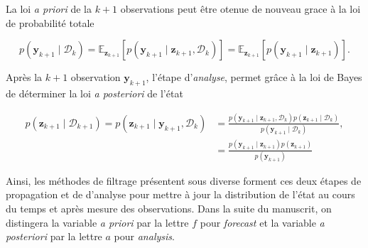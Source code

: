 La loi \textit{a priori} de la $k+1$ observations peut être otenue de nouveau grace à la loi de probabilité totale

\begin{equation*}
    p(\bm y_{k+1} \mid \mathcal D_k) = \mathbb{E}_{\bm{z}_{k+1}}\left[p(\bm y_{k+1}\mid \bm z_{k+1},\mathcal D_k)\right] = \mathbb{E}_{\bm{z}_{k+1}}\left[p(\bm y_{k+1}\mid \bm z_{k+1})\right].
\end{equation*}

Après la $k+1$ observation $\bm y_{k+1}$, l'étape d'\textit{analyse}, permet grâce à la loi de Bayes de déterminer la loi \textit{a posteriori} de l'état

\begin{eqnarray*}
    p(\bm z_{k+1} \mid \mathcal D_{k+1}) = p(\bm z_{k+1} \mid \bm y_{k+1}, \mathcal D_{k})  &= \frac{p(\bm y_{k+1} \mid \bm z_{k+1} ,\mathcal D_k)  p(\bm z_{k+1}\mid \mathcal D_k)}{p(\bm y_{k+1}\mid \mathcal D_k)}, \\
    &= \frac{p(\bm y_{k+1} \mid \bm z_{k+1})  p(\bm z_{k+1})}{p(\bm y_{k+1})}
\end{eqnarray*}

Ainsi, les méthodes de filtrage présentent sous diverse forment ces deux étapes de propagation et de d'analyse pour mettre à jour la distribution de l'état au cours du temps et après mesure des observations. Dans la suite du manuscrit, on distingera la variable \textit{a priori} par la lettre $f$ pour \textit{forecast} et la variable \textit{a posteriori} par la lettre $a$ pour \textit{analysis}.




